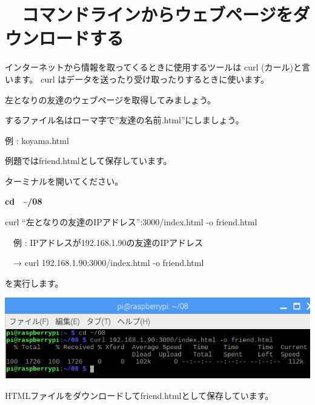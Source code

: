 \clearpage\section{\theExercise　コマンドラインからウェブページをダウンロードする}
\addtocounter{Exercise}{-1}\label{E:CURL}
インターネットから情報を取ってくるときに使用するツールは
curl (カール)と言います。 curl
はデータを送ったり受け取ったりするときに使います。

左となりの友達のウェブページを取得してみましょう。

するファイル名はローマ字で”友達の名前.html”にしましょう。

例 : koyama.html

例題ではfriend.htmlとして保存しています。

ターミナルを開いてください。

\textbf{cd \ {\textasciitilde}/08}

curl “左となりの友達のIPアドレス”:3000/index.html -o
friend.html

\ \ 例 :
IPアドレスが192.168.1.90の友達のIPアドレス

\ \ → curl 192.168.1.90:3000/index.html -o friend.html

を実行します。

\begin{center}
\includegraphics[width=\textwidth]{./text08-img/textbook-img005.png}

\end{center}

\bigskip

HTMLファイルをダウンロードしてfriend.htmlとして保存しています。




